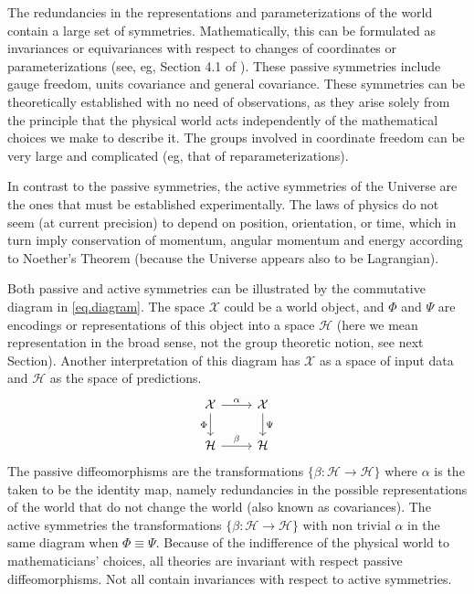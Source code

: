 \documentclass{article}
\begin{document}
The redundancies in the representations and parameterizations of the world contain a large set of symmetries.
Mathematically, this can be formulated as invariances or equivariances with respect to changes of coordinates or parameterizations (see, eg, Section 4.1 of \cite{rovelli2000loop}).
These passive symmetries include gauge freedom, units covariance and general covariance.
These symmetries can be theoretically established with no need of observations, as they arise solely from the principle that the physical world acts independently of the mathematical choices we make to describe it.
The groups involved in coordinate freedom can be very large and complicated (eg, that of reparameterizations).

In contrast to the passive symmetries, the active symmetries of the Universe are the ones that must be established experimentally.
The laws of physics do not seem (at current precision) to depend on position, orientation, or time, which in turn imply conservation of momentum, angular momentum and energy according to Noether's Theorem \cite{noether} (because the Universe appears also to be Lagrangian).

Both passive and active symmetries can be illustrated by the commutative diagram in \eqref{eq.diagram}. The space $\mathcal X$ could be a world object, and $\Phi$ and $\Psi$ are encodings or representations of this object into a space $\mathcal H$ (here we mean representation in the broad sense, not the group theoretic notion, see next Section). Another interpretation of this diagram has $\mathcal X$ as a space of input data and $\mathcal H$ as the space of predictions.
\vspace{-1ex}%
\begin{equation}\label{eq.diagram}
\begin{tikzcd}[]
  {\cal X}\arrow[r,"\alpha"] \arrow[d,"\Phi",swap] & {\cal X}  \arrow[d,"\Psi"]\\
{\cal H} \arrow[r,"\beta"]  & {\cal H} 
\end{tikzcd}
\end{equation}
The passive diffeomorphisms are the transformations $\{\beta:\mathcal H \to \mathcal H\}$ where $\alpha$ is the taken to be the identity map, namely redundancies in the possible representations of the world that do not change the world (also known as covariances). The active symmetries the transformations $\{\beta:\mathcal H \to \mathcal H\}$ with non trivial $\alpha$ in the same diagram when $\Phi\equiv \Psi$.
Because of the indifference of the physical world to mathematicians' choices, all theories are invariant with respect passive diffeomorphisms.
Not all contain invariances with respect to active symmetries. 
\end{document}

